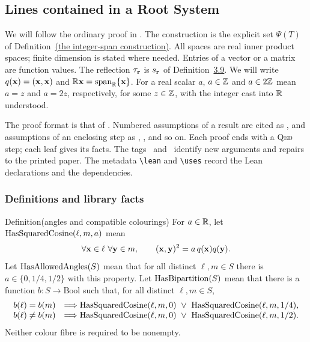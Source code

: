 \subsection{Lines contained in a Root System}\label{sec:thm312}
\begin{mergedproofsection}
We will follow the ordinary proof in
. The construction is the explicit set
$\Psi(T)$ of Definition~\hyperref[def:312-integral-roots]{(the integer-span construction)}.
All spaces are real inner product spaces; finite dimension is stated
where needed. Entries of a vector or a matrix are function values.
The reflection $\tau_{{\mathbf r}}$ is $s_{{\mathbf r}}$ of
Definition~\hyperref[def:3.9]{3.9}. We will write $q({\mathbf x})=({\mathbf x},{\mathbf x})$ and
${\mathbb R}{\mathbf x}=\mathop{\mathrm{span}}\nolimits_{{\mathbb R}}\{{\mathbf x}\}$. For a real scalar $a$,
$a\in{\mathbb Z}$ and
$a\in2{\mathbb Z}$ mean $a=z$ and $a=2z$, respectively, for some $z\in{\mathbb Z}$,
with the integer cast into ${\mathbb R}$ understood.

The proof format is that of \cite{L95}. Numbered assumptions of a result
are cited as , and assumptions of an enclosing step as
, , and so on. Each proof ends with a \textsc{Qed} step;
each leaf gives its facts. The tags \new\ and \repair\ identify new
arguments and repairs to the printed paper. The metadata
\verb|\lean| and \verb|\uses| record the Lean declarations and the dependencies.

\subsubsection{Definitions and library facts}

\begin{namedresult}{Definition}{(angles and compatible colourings)}\label{def:312-angles}
\uses{}
For $a\in{\mathbb R}$, let $\mathop{\mathrm{HasSquaredCosine}}\nolimits(\ell,m,a)$ mean
\[
 \forall{\mathbf x}\in\ell\ \forall{\mathbf y}\in m,\qquad
 ({\mathbf x},{\mathbf y})^2=a\,q({\mathbf x})q({\mathbf y}).
\]
Let $\mathop{\mathrm{HasAllowedAngles}}\nolimits(S)$ mean that for all distinct
$\ell,m\in S$ there is $a\in\{0,1/4,1/2\}$ with this property.
Let $\mathop{\mathrm{HasBipartition}}\nolimits(S)$ mean that there is a function
$b:S\to\mathrm{Bool}$ such that, for all distinct $\ell,m\in S$,
\[
\begin{array}{ll}
b(\ell)=b(m)&\Longrightarrow
 \mathop{\mathrm{HasSquaredCosine}}\nolimits(\ell,m,0)\ \lor\
 \mathop{\mathrm{HasSquaredCosine}}\nolimits(\ell,m,1/4),\\
b(\ell)\ne b(m)&\Longrightarrow
 \mathop{\mathrm{HasSquaredCosine}}\nolimits(\ell,m,0)\ \lor\
 \mathop{\mathrm{HasSquaredCosine}}\nolimits(\ell,m,1/2).
\end{array}
\]
Neither colour fibre is required to be nonempty.
\end{namedresult}


\end{mergedproofsection}
